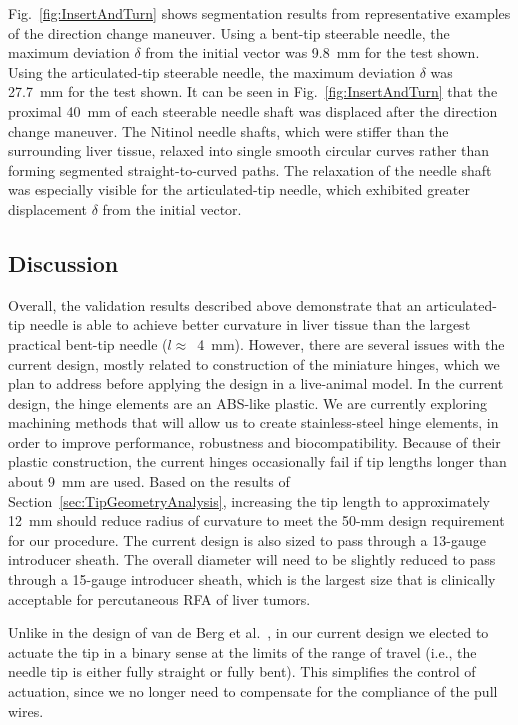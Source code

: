 Fig.~\ref{fig:InsertAndTurn} shows segmentation results from representative examples of the direction change maneuver. Using a bent-tip steerable needle, the maximum deviation $\delta$ from the initial vector was 9.8~mm for the test shown. Using the articulated-tip steerable needle, the maximum deviation $\delta$ was 27.7~mm for the test shown. It can be seen in Fig.~\ref{fig:InsertAndTurn} that the proximal 40~mm of each steerable needle shaft was displaced after the direction change maneuver. The Nitinol needle shafts, which were stiffer than the surrounding liver tissue, relaxed into single smooth circular curves rather than forming segmented straight-to-curved paths. The relaxation of the needle shaft was especially visible for the articulated-tip needle, which exhibited greater displacement $\delta$ from the initial vector.

\subsection{Discussion}
\label{sec:ArticDiscussion}
Overall, the validation results described above demonstrate that an articulated-tip needle is able to achieve better curvature in liver tissue than the largest practical bent-tip needle ($l \approx$~4~mm). However, there are several issues with the current design, mostly related to construction of the miniature hinges, which we plan to address before applying the design in a live-animal model. In the current design, the hinge elements are an ABS-like plastic. We are currently exploring machining methods that will allow us to create stainless-steel hinge elements, in order to improve performance, robustness and biocompatibility. Because of their plastic construction, the current hinges occasionally fail if tip lengths longer than about 9~mm are used. Based on the results of Section~\ref{sec:TipGeometryAnalysis}, increasing the tip length to approximately 12~mm should reduce radius of curvature to meet the 50-mm design requirement for our procedure. The current design is also sized to pass through a 13-gauge introducer sheath. The overall diameter will need to be slightly reduced to pass through a 15-gauge introducer sheath, which is the largest size that is clinically acceptable for percutaneous RFA of liver tumors.

Unlike in the design of van de Berg et al.~\cite{vandeBerg2015}, in our current design we elected to actuate the tip in a binary sense at the limits of the range of travel (i.e., the needle tip is either fully straight or fully bent). This simplifies the control of actuation, since we no longer need to compensate for the compliance of the pull wires. 

